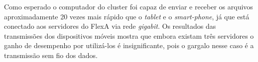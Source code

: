     Como esperado o computador do cluster foi capaz de enviar e receber os arquivos aproximadamente 20 vezes mais rápido que o \textit{tablet} e o \textit{smart-phone}, já que está conectado aos servidores do FlexA via rede \textit{gigabit}. Os resultados das transmissões dos dispositivos móveis mostra que embora existam três servidores o ganho de desempenho por utilizá-los é insignificante, pois o gargalo nesse caso é a transmissão sem fio dos dados.